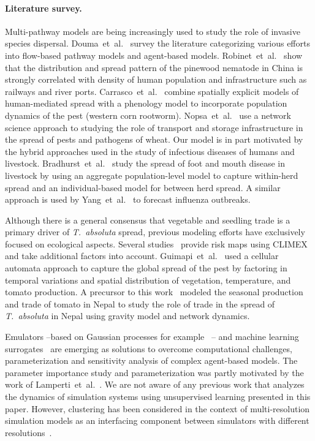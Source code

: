 \documentclass[11pt]{article}
\newcommand{\tuta}{\emph{T.~absoluta}}
\theoremstyle{definition}
\begin{document}
\paragraph{Literature survey.} Multi-pathway models are being increasingly
used to study the role of invasive species dispersal.
Douma~et~al.~\cite{douma2016pathway} survey the literature categorizing
various efforts into flow-based pathway models and agent-based models.
Robinet~et~al.~\cite{robinet2009role} show that the distribution and spread
pattern of the pinewood nematode in China is strongly correlated with
density of human population and infrastructure such as railways and river
ports.  Carrasco~et~al.~\cite{carrasco2010unveiling} combine spatially
explicit models of human-mediated spread with a phenology model to
incorporate population dynamics of the pest (western corn rootworm).
Nopsa~et~al.~\cite{nopsa2015ecological} use a network science approach to
studying the role of transport and storage infrastructure in the spread of
pests and pathogens of wheat.  Our model is in part motivated by the hybrid
approaches used in the study of infectious diseases of humans and
livestock.  Bradhurst~et~al.~\cite{bradhurst2015hybrid} study the spread of
foot and mouth disease in livestock by using an aggregate population-level
model to capture within-herd spread and an individual-based model for
between herd spread. A similar approach is used by
Yang~et~al.~\cite{yang2016} to forecast influenza outbreaks.

Although there is a general consensus that vegetable and seedling trade is
a primary driver of \tuta{} spread, previous modeling efforts have
exclusively focused on ecological aspects. Several
studies~\cite{desneux2010biological,tonnang2015identification} provide risk
maps using CLIMEX and take additional factors into account.
Guimapi~et~al.~\cite{guimapi2016modeling} used a cellular automata approach
to capture the global spread of the pest by factoring in temporal
variations and spatial distribution of vegetation, temperature, and tomato
production. A precursor to this work~\cite{venkatramanan2019modeling}
modeled the seasonal production and trade of tomato in Nepal to study the
role of trade in the spread of \tuta{} in Nepal using gravity model and
network dynamics.

Emulators --based on Gaussian processes for
example~\cite{fadikar2018calibrating} -- and machine learning
surrogates~\cite{lamperti2018agent} are emerging as solutions to overcome
computational challenges, parameterization and sensitivity analysis of
complex agent-based models. The parameter importance study and
parameterization was partly motivated by the work of
Lamperti~et~al.~\cite{lamperti2018agent}. We are not aware of any previous
work that analyzes the dynamics of simulation systems using unsupervised
learning presented in this paper. However, clustering has been considered
in the context of multi-resolution simulation models as an interfacing
component between simulators with different
resolutions~\cite{cassandras2000clustering}.
\end{document}
